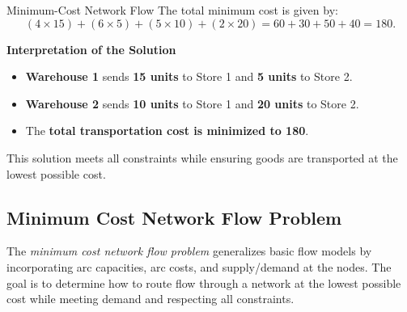 \begin{examplewithallcode}{Minimum-Cost Network Flow}
The total minimum cost is given by:
\[
(4 \times 15) + (6 \times 5) + (5 \times 10) + (2 \times 20) = 60 + 30 + 50 + 40 = 180.
\]

\textbf{Interpretation of the Solution}

\begin{itemize}
    \item \textbf{Warehouse 1} sends \textbf{15 units} to Store 1 and \textbf{5 units} to Store 2.
    \item \textbf{Warehouse 2} sends \textbf{10 units} to Store 1 and \textbf{20 units} to Store 2.
    \item The \textbf{total transportation cost is minimized to 180}.
\end{itemize}

This solution meets all constraints while ensuring goods are transported at the lowest possible cost.

\end{examplewithallcode}
\newpage

\subsection{Minimum Cost Network Flow Problem}
\label{sec:min-cost-network-flow}

The \emph{minimum cost network flow problem} generalizes basic flow models by incorporating arc capacities, arc costs, and supply/demand at the nodes. The goal is to determine how to route flow through a network at the lowest possible cost while meeting demand and respecting all constraints.

